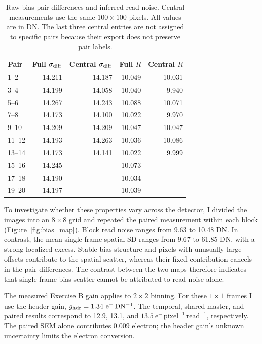\documentclass[12pt,letterpaper,twocolumn]{article}
\begin{document}
\begin{table}[tp]
 \centering\small
 \caption{Raw-bias pair differences and inferred read noise.
 Central measurements use the same $100\times100$ pixels.
 All values are in DN. The last three central entries are not assigned
 to specific pairs because their export does not preserve pair labels.}
 \label{tab:a_bias_pairs}
 \begin{tabular}{lrrrr}
  \toprule
  Pair & Full $\sigma_{\rm diff}$ & Central $\sigma_{\rm diff}$
       & Full $R$ & Central $R$\\
  \midrule
  1--2   & 14.211 & 14.187 & 10.049 & 10.031\\
  3--4   & 14.199 & 14.058 & 10.040 & 9.940\\
  5--6   & 14.267 & 14.243 & 10.088 & 10.071\\
  7--8   & 14.173 & 14.100 & 10.022 & 9.970\\
  9--10  & 14.209 & 14.209 & 10.047 & 10.047\\
  11--12 & 14.193 & 14.263 & 10.036 & 10.086\\
  13--14 & 14.173 & 14.141 & 10.022 & 9.999\\
  15--16 & 14.245 & --- & 10.073 & ---\\
  17--18 & 14.190 & --- & 10.034 & ---\\
  19--20 & 14.197 & --- & 10.039 & ---\\
  \bottomrule
 \end{tabular}
\end{table}
To investigate whether these properties vary across the detector, I
divided the images into an $8\times8$ grid and repeated the paired
measurement within each block
(Figure~\ref{fig:bias_map}). Block read noise ranges from 9.63 to
10.48 DN. In contrast, the mean single-frame spatial SD ranges from
9.67 to 61.85 DN, with a strong localized excess. Stable bias structure and pixels with unusually large offsets contribute
to the spatial scatter, whereas their fixed contribution cancels in the
pair differences. The contrast between the two maps therefore indicates
that single-frame bias scatter cannot be attributed to read noise alone.

The measured Exercise B gain applies to $2\times2$ binning. For
these $1\times1$ frames I use the header gain,
$g_{\rm hdr}=1.34~\mathrm{e^-\,DN^{-1}}$. The temporal, shared-master,
and paired results correspond to 12.9, 13.1, and $\boxed{13.5~\mathrm{e^-\,pixel^{-1}\,read^{-1}}}$, respectively.
The paired SEM alone contributes 0.009 electron; the header gain's
unknown uncertainty limits the electron conversion.
\end{document}
